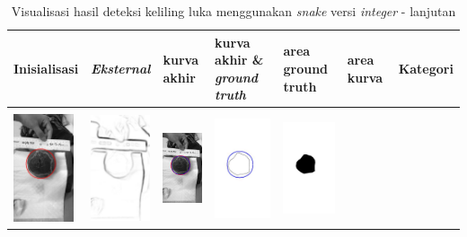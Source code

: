 \begin{table}[H]
	\centering
	\caption{Visualisasi hasil deteksi keliling luka menggunakan \emph{snake} versi \emph{integer} - lanjutan}
	\label{tabel_hasil_6}
	\begin{tabular}{|m{0.7in}|m{0.7in}|m{0.7in}|m{0.7in}|m{0.7in}|m{0.7in}|m{0.7in}|}
		\hline
		\textbf{Inisialisasi} & \textbf{\emph{Eksternal}} & \textbf{kurva akhir} & \textbf{kurva akhir \& \emph{ground truth}}& \textbf{area ground truth} & \textbf{area kurva} & \textbf{Kategori} \\
		\hline
		
		&  &  & & & &  \\
		\includegraphics[width=0.7in]{dataset/dataset_3/luka_merah/ready/9_integer_init.jpg}&
		\includegraphics[width=0.7in]{dataset/dataset_3/luka_merah/ready/9_integer_ext.jpg}&
		\includegraphics[width=0.7in]{dataset/dataset_3/luka_merah/ready/9_integer_result.jpg}&
		\includegraphics[width=0.7in]{dataset/dataset_3/luka_merah/ready/9_gt_r_integer.jpg}&
		\includegraphics[width=0.7in]{dataset/dataset_3/luka_merah/ready/9_r.jpg}&

\end{tabular}
\end{table}

